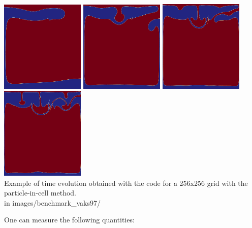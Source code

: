 \begin{center}
\includegraphics[width=4cm]{images/benchmark_vaks97/elefant256_0500.png}
\includegraphics[width=4cm]{images/benchmark_vaks97/elefant256_1000.png}
\includegraphics[width=4cm]{images/benchmark_vaks97/elefant256_1500.png}
\includegraphics[width=4cm]{images/benchmark_vaks97/elefant256_2000.png}\\
{\captionfont Example of time evolution obtained with the \elefant code for 
a 256x256 grid with the particle-in-cell method.\\
{\tiny {\color{gray} in images/benchmark\_vaks97/}}  }
\end{center}

One can measure the following quantities:

